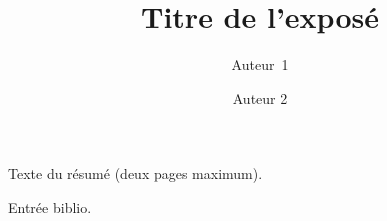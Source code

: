 \documentclass[a4paper]{article}
\title{Titre de l'exposé}
\author{Auteur~1 \and Auteur 2}
\date{}
\begin{document}
\maketitle

Texte du résumé (deux pages maximum).

\begin{thebibliography}{0}
\bibitem{} Entrée biblio.
\end{thebibliography}
\end{document}
